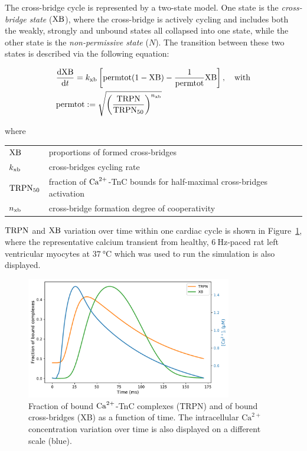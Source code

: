 \vspace{0.3cm}
The cross-bridge cycle is represented by a two-state model. One state is the \textit{cross-bridge state} ($\textrm{XB}$), where the cross-bridge is actively cycling and includes both the weakly, strongly and unbound states all collapsed into one state, while the other state is the \textit{non-permissive state} ($N$). The transition between these two states is described via the following equation:

\begin{align}\label{eq:landodesys2}
    & \dfrac{\mathrm{d}{\textrm{XB}}}{\mathrm{d}{t}} = k_{\textrm{xb}}\left[\textrm{permtot}(1-\textrm{XB})-\frac{1}{\textrm{permtot}}\textrm{XB}\right],\quad\text{with} \\
    & \textrm{permtot} := \sqrt{\left(\frac{\textrm{TRPN}}{\textrm{TRPN}_{50}}\right)^{n_{\textrm{xb}}}} \nonumber
\end{align}

\noindent
where

\vspace{0.2cm}
\begin{tabular}{ll}
    $\textrm{XB}$    & proportions of formed cross-bridges \\
    $k_{\textrm{xb}}$   & cross-bridges cycling rate \\
    $\textrm{TRPN}_{50}$ & fraction of $\textrm{Ca}^{2+}$-TnC bounds for half-maximal cross-bridges activation \\
    $n_{\textrm{xb}}$   & cross-bridge formation degree of cooperativity
\end{tabular}

\vspace{0.3cm}\noindent
$\textrm{TRPN}$ and $\textrm{XB}$ variation over time within one cardiac cycle is shown in Figure~\ref{fig:catrpnxb}, where the representative calcium
transient from healthy, $\SI{6}{\hertz}$-paced rat left ventricular myocytes at $\SI{37}{\celsius}$ which was used to run the simulation is also displayed.

\begin{figure}[!ht]
    \myfloatalign
    \includegraphics[width=0.8\textwidth]{figures/chapter02/Ca_TRPN_XB.pdf}
    \caption{Fraction of bound $\textrm{Ca}^{2+}$-TnC complexes (TRPN) and of bound cross-bridges (XB) as a function of time. The intracellular $\textrm{Ca}^{2+}$ concentration variation over time is also displayed on a different scale (blue).}
    \label{fig:catrpnxb}
\end{figure}

